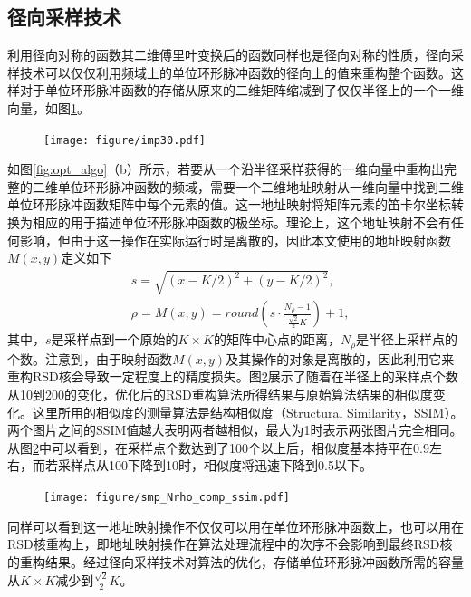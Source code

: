 \documentclass[master]{shtthesis}             %
\begin{document}
\subsection{径向采样技术}

利用径向对称的函数其二维傅里叶变换后的函数同样也是径向对称的性质\citep{baddour2011two}，径向采样技术可以仅仅利用频域上的单位环形脉冲函数的径向上的值来重构整个函数。这样对于单位环形脉冲函数的存储从原来的二维矩阵缩减到了仅仅半径上的一个一维向量，如图\ref{fig:imp_rad}。
\begin{figure}[!tb]
    \centering
    \texttt{[image: figure/imp30.pdf]}
    \label{fig:imp_rad}
\end{figure}

如图\ref{fig:opt_algo}（b）所示，若要从一个沿半径采样获得的一维向量中重构出完整的二维单位环形脉冲函数的频域，需要一个二维地址映射从一维向量中找到二维单位环形脉冲函数矩阵中每个元素的值。这一地址映射将矩阵元素的笛卡尔坐标转换为相应的用于描述单位环形脉冲函数的极坐标。理论上，这个地址映射不会有任何影响，但由于这一操作在实际运行时是离散的，因此本文使用的地址映射函数$M(x,y)$定义如下
\begin{align}
    &s=\sqrt{(x-K/2)^2+(y-K/2)^2},  \\
    &\rho = M(x, y) = round\left( s\cdot \frac{N_{\rho}-1}{\frac{\sqrt{2}}{2}K} \right)+1,\label{eq:mapping_func}
\end{align}
其中，$s$是采样点到一个原始的$K\times K$的矩阵中心点的距离，$N_\rho$是半径上采样点的个数。注意到，由于映射函数$M(x,y)$及其操作的对象是离散的，因此利用它来重构RSD核会导致一定程度上的精度损失。图\ref{fig:smp_comp}展示了随着在半径上的采样点个数从10到200的变化，优化后的RSD重构算法所得结果与原始算法结果的相似度变化。这里所用的相似度的测量算法是结构相似度（Structural Similarity，SSIM）。两个图片之间的SSIM值越大表明两者越相似，最大为1时表示两张图片完全相同。从图\ref{fig:smp_comp}中可以看到，在采样点个数达到了100个以上后，相似度基本持平在0.9左右，而若采样点从100下降到10时，相似度将迅速下降到0.5以下。
\begin{figure}[!tb]
    \centering
    \texttt{[image: figure/smp\_Nrho\_comp\_ssim.pdf]}
    \label{fig:smp_comp}
\end{figure}

同样可以看到这一地址映射操作不仅仅可以用在单位环形脉冲函数上，也可以用在RSD核重构上，即地址映射操作在算法处理流程中的次序不会影响到最终RSD核的重构结果。经过径向采样技术对算法的优化，存储单位环形脉冲函数所需的容量从$K\times K$减少到$\frac{\sqrt{2}}{2}K$。
\end{document}
